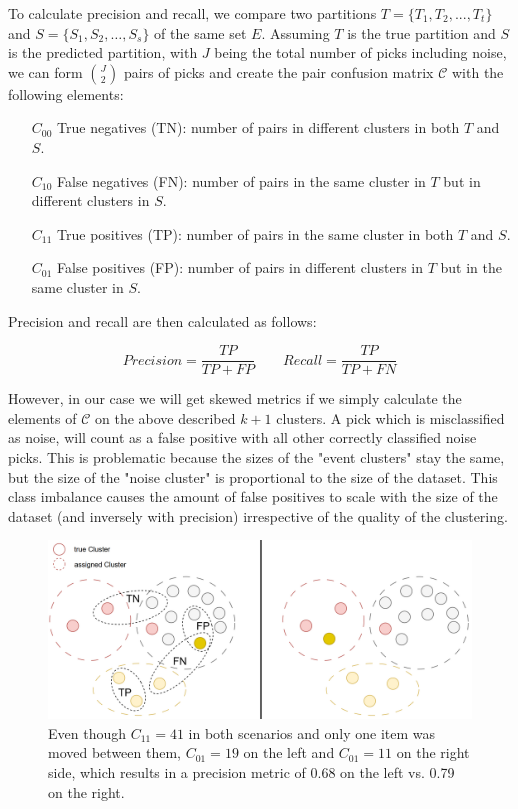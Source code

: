 \documentclass{scrreprt}
\begin{document}
To calculate precision and recall, we compare two partitions $T = \{T_1, T_2, ..., T_t\}$ and $S = \{S_1, S_2, \ldots, S_s\}$ of the same set $E$. Assuming $T$ is the true partition and $S$ is the predicted partition, with $J$ being the total number of picks including noise, we can form $\binom{J}{2}$ pairs of picks and create the pair confusion matrix $\mathcal{C}$ with the following elements:

\begin{enumerate}
    \item[$C_{00}$] True negatives (TN): number of pairs in different clusters in both $T$ and $S$.
    \item[$C_{10}$] False negatives (FN): number of pairs in the same cluster in $T$ but in different clusters in $S$.
    \item[$C_{11}$] True positives (TP): number of pairs in the same cluster in both $T$ and $S$.
    \item[$C_{01}$] False positives (FP): number of pairs in different clusters in $T$ but in the same cluster in $S$.
\end{enumerate}

Precision and recall are then calculated as follows:

\begin{equation}
    Precision = \frac{TP}{TP + FP} \qquad Recall = \frac{TP}{TP + FN}
\end{equation}

However, in our case we will get skewed metrics if we simply calculate the elements of $\mathcal{C}$ on the above described $k+1$ clusters. A pick which is misclassified as noise, will count as a false positive with all other correctly classified noise picks. This is problematic because the sizes of the "event clusters" stay the same, but the size of the "noise cluster" is proportional to the size of the dataset. This class imbalance causes the amount of false positives to scale with the size of the dataset (and inversely with precision) irrespective of the quality of the clustering.

\begin{figure}[ht]
\centering
\includegraphics[width=0.9\linewidth]{plots/classes.png}
\caption{\label{fig:classes}Even though $C_{11}=41$ in both scenarios and only one item was moved between them, $C_{01} = 19$ on the left and $C_{01} = 11$ on the right side, which results in a precision metric of 0.68 on the left vs. 0.79 on the right. }
\end{figure}
\end{document}
